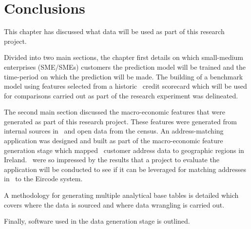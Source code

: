 \section{Conclusions}\label{desConc}
This chapter has discussed what data will be used as part of this research project. 

Divided into two main sections, the chapter first details on which small-medium enterprises (SME/SMEs) customers the prediction model will be trained and the time-period on which the prediction will be made. The building of a benchmark model using features selected from a historic \subjectname\ credit scorecard which will be used for comparisons carried out as part of the research experiment was delineated.

The second main section discussed the macro-economic features that were generated as part of this research project. These features were generated from internal sources in \subjectname\ and open data from the census. An address-matching application was designed and built as part of the macro-economic feature generation stage which mapped \subjectname\ customer address data to geographic regions in Ireland. \subjectname\ were so impressed by the results that a project to evaluate the application will be conducted to see if it can be leveraged for matching addresses in \subjectname\ to the Eircode system.

A methodology for generating multiple analytical base tables is detailed which covers where the data is sourced and where data wrangling is carried out. 

Finally, software used in the data generation stage is outlined.
